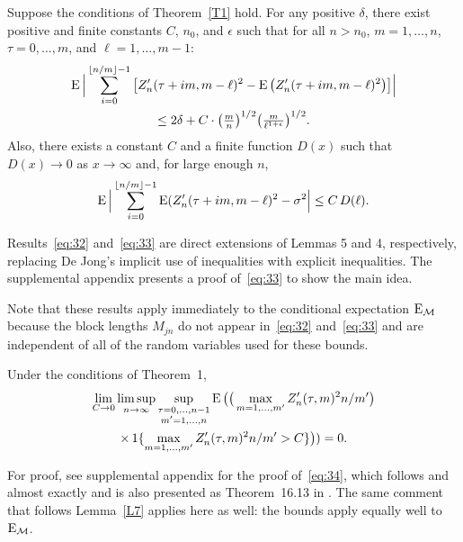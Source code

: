 \documentclass[11pt]{article}
\begin{document}
\begin{lem}\label{L7}
\newcommand{\isum}{\sum_{i=0}^{\lfloor n/m \rfloor - 1}}
  Suppose the conditions of Theorem~\ref{T1} hold.
  For any positive $\delta$, there exist positive and finite constants
  $C$, $n_0$, and $\epsilon$ such that
  for all $n > n_0$, $m = 1,\dots,n$, $\tau = 0,\dots,m$, and $\ell =
  1,\dots,m-1$:
\begin{multline}\label{eq:32}
    \E \Big\lvert \isum \big[Z_n'(\tau + i m, m - \ell)^2
    - \E \big(Z_n'(\tau + i m, m - \ell)^2\big) \big]\Big\rvert \\
    \leq 2 \delta + C \cdot \big(\tfrac{m}{n}\big)^{1/2}
    \big(\tfrac{m}{\ell^{1+\epsilon}}\big)^{1/2}.
\end{multline}
Also, there exists a constant $C$ and a finite function $D(x)$ such
that $D(x) \to 0$ as $x \to \infty$ and, for large enough $n$,
  \begin{equation}
    \label{eq:33}
    \E \Big\lvert \isum \E(Z_n'(\tau + i m, m - \ell)^2
    - \sigma^2 \Big\rvert \leq C\, D(\ell).
  \end{equation}
\end{lem}

Results~\eqref{eq:32} and~\eqref{eq:33} are direct extensions of
 Lemmas 5 and 4, respectively, replacing De Jong's
implicit use of inequalities with explicit inequalities. The
supplemental appendix presents a proof of~\eqref{eq:33} to show the
main idea.

Note that these results apply immediately to the conditional expectation
$\operatorname{E}_{\mathcal{M}}$ because the block lengths $M_{jn}$ do not appear in~\eqref{eq:32}
and~\eqref{eq:33} and are independent of all of the random variables
used for these bounds.

\begin{lem}\label{L8}
\newcommand{\uiterm}{\max_{m \in 1,\dots,m'} \Big(
  \sum_{t \in I_n(\tau, m)} (X_{nt} - \mu_{nt})\Big)^2 \Big/
  \sum_{t\in I_n(\tau, m')} c_{nt}^2}
\newcommand{\uitermb}{(1/m') \max_{m \in 1,\dots,m'} \Big(
  \sum_{t \in I_n^*(\tau, m)} (X_{nt} - \mu_{nt})\Big)^2}
  Under the conditions of Theorem~1,
  \begin{multline}\label{eq:34}
    \lim_{C \to 0} \limsup_{n \to \infty} \sup_{\substack{\tau = 0,\dots,n-1 \\  m' = 1,\dots,n}}
    \operatorname{E}\big(\big(\max_{m=1,\dots,m'} Z'_n(\tau, m)^2 n / m'\big) \\
    \times\operatorname{1}\{\max_{m=1,\dots,m'} Z'_n(\tau, m)^2 n / m' > C\}\big)) = 0.
  \end{multline}
\end{lem}

For proof, see supplemental appendix for the proof of~\eqref{eq:34}, which
follows \citet[Lemma 6.5]{Mcl:75b} and \citet[Lemma 3.5]{Mcl:77}
almost exactly and is also presented as Theorem~16.13 in
\citet{Dav:94}. The same comment that follows
Lemma~\ref{L7} applies here as well: the bounds
apply equally well to $\operatorname{E}_{\mathcal{M}}$.


\end{document}
